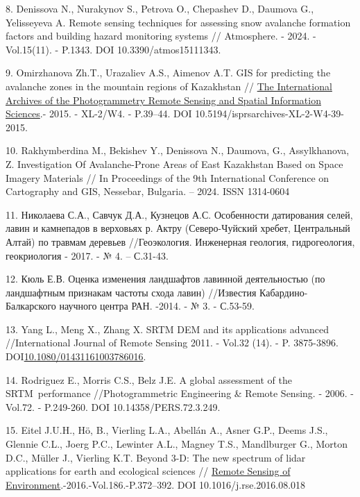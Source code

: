 \begin{references}
8. Denissova N., Nurakynov S., Petrova O., Chepashev D., Daumova G.,
Yelisseyeva A. Remote sensing techniques for assessing snow avalanche
formation factors and building hazard monitoring systems // Atmosphere.
- 2024. - Vol.15(11). - P.1343. DOI 10.3390/atmos15111343.

9. Omirzhanova Zh.T., Urazaliev A.S., Aimenov A.T. GIS for predicting
the avalanche zones in the mountain regions of Kazakhstan //
\href{https://www.researchgate.net/journal/The-International-Archives-of-the-Photogrammetry-Remote-Sensing-and-Spatial-Information-Sciences-2194-9034?_tp=eyJjb250ZXh0Ijp7ImZpcnN0UGFnZSI6InB1YmxpY2F0aW9uIiwicGFnZSI6InB1YmxpY2F0aW9uIn19}{The
International Archives of the Photogrammetry Remote Sensing and Spatial
Information Sciences}.- 2015. - XL-2/W4. - P.39--44. DOI
10.5194/isprsarchives-XL-2-W4-39-2015.

10. Rakhymberdina M., Bekishev Y., Denissova N., Daumova, G.,
Assylkhanova, Z. Investigation Of Avalanche-Prone Areas of East
Kazakhstan Based on Space Imagery Materials // In Proceedings of the 9th
International Conference on Cartography and GIS, Nessebar, Bulgaria. --
2024. ISSN 1314-0604

11. Николаева С.А., Савчук Д.А., Кузнецов А.С. Особенности датирования
селей, лавин и камнепадов в верховьях р. Актру (Северо-Чуйский хребет,
Центральный Алтай) по травмам деревьев //Геоэкология. Инженерная
геология, гидрогеология, геокриология - 2017. - № 4. -- С.31-43.

12. Кюль Е.В. Оценка изменения ландшафтов лавинной деятельностью (по
ландшафтным признакам частоты схода лавин) //Известия
Кабардино-Балкарского научного центра РАН. -2014. - № 3. - С.53-59.

13. Yang L., Meng X., Zhang X. SRTM DEM and its applications advanced
//International Journal of Remote Sensing 2011. - Vol.32 (14). - P.
3875-3896.
DOI\href{http://dx.doi.org/10.1080/01431161003786016}{10.1080/01431161003786016}.

14. Rodriguez E., Morris C.S., Belz J.E. A global assessment of the
SRTM~performance //Photogrammetric Engineering \& Remote Sensing. -
2006. -Vol.72. - P.249-260. DOI 10.14358/PERS.72.3.249.

15. Eitel J.U.H., Hö, B., Vierling L.A., Abellán A., Asner G.P., Deems
J.S., Glennie C.L., Joerg P.C., Lewinter A.L., Magney T.S., Mandlburger
G., Morton D.C., Müller J., Vierling K.T. Beyond 3-D: The new spectrum
of lidar applications for earth and ecological sciences //
\href{https://asu.elsevierpure.com/en/publications/beyond-3-d-the-new-spectrum-of-lidar-applications-for-earth-and-e}{\hfill\break
Remote Sensing of Environment}.-2016.-Vol.186.-P.372--392. DOI
10.1016/j.rse.2016.08.018


\end{references}
